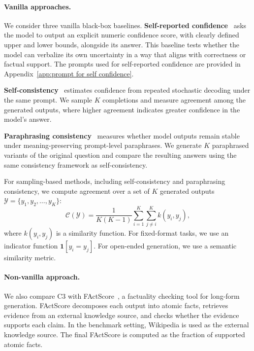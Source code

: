 \documentclass[11pt]{article}
\theoremstyle{plain}
\theoremstyle{definition}
\theoremstyle{remark}
\begin{document}
\paragraph{Vanilla approaches.}
We consider three vanilla black-box baselines. \textbf{Self-reported confidence}~\citep{lin2022teaching} asks the model to output an explicit numeric confidence score, with clearly defined upper and lower bounds, alongside its answer. This baseline tests whether the model can verbalize its own uncertainty in a way that aligns with correctness or factual support. The prompts used for self-reported confidence are provided in Appendix~\ref{app:prompt for self confidence}.

\textbf{Self-consistency}~\citep{DBLP:conf/iclr/0002WSLCNCZ23} estimates confidence from repeated stochastic decoding under the same prompt. We sample $K$ completions and measure agreement among the generated outputs, where higher agreement indicates greater confidence in the model's answer.

\textbf{Paraphrasing consistency}~\citep{portillo-wightman-etal-2023-strength} measures whether model outputs remain stable under meaning-preserving prompt-level paraphrases. We generate $K$ paraphrased variants of the original question and compare the resulting answers using the same consistency framework as self-consistency.

For sampling-based methods, including self-consistency and paraphrasing consistency, we compute agreement over a set of $K$ generated outputs $\mathcal{Y} = \{y_1, y_2, \dots, y_K\}$:
\begin{equation}
\mathcal{C}(\mathcal{Y}) =
\frac{1}{K(K-1)}
\sum_{i=1}^{K}
\sum_{j \neq i}^{K}
k(y_i, y_j),
\label{eq:consistency}
\end{equation}
where $k(y_i, y_j)$ is a similarity function. For fixed-format tasks, we use an indicator function $\mathbf{1}[y_i = y_j]$. For open-ended generation, we use a semantic similarity metric.

\paragraph{Non-vanilla approach.}
We also compare C3 with FActScore~\citep{min-etal-2023-factscore}, a factuality checking tool for long-form generation. FActScore decomposes each output into atomic facts, retrieves evidence from an external knowledge source, and checks whether the evidence supports each claim. In the benchmark setting, Wikipedia is used as the external knowledge source. The final FActScore is computed as the fraction of supported atomic facts.
\end{document}

